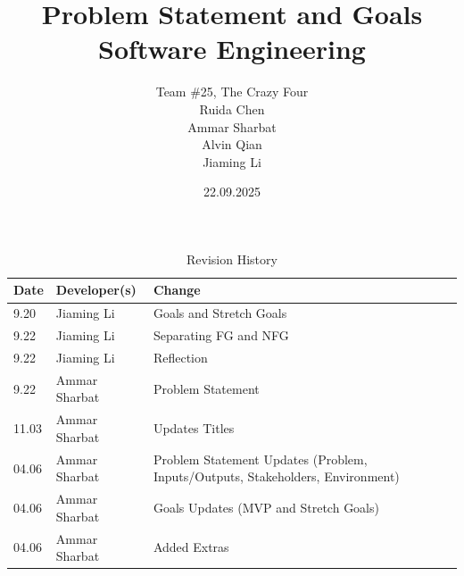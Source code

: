 \documentclass{article}
\title{Problem Statement and Goals\\\SE Software Engineering}
\author{
    Team \#25, The Crazy Four \\[1ex]
    Ruida Chen \\
    Ammar Sharbat \\
    Alvin Qian \\
    Jiaming Li \\
}
\date{22.09.2025}
\begin{document}
    \maketitle

    \begin{table}[hp]
        \caption{Revision History} \label{TblRevisionHistory}
        \begin{tabularx}{\textwidth}{llX}
            \toprule
            \textbf{Date} & \textbf{Developer(s)} & \textbf{Change}\\
            \midrule
            9.20 & Jiaming Li & Goals and Stretch Goals\\
            9.22 & Jiaming Li & Separating FG and NFG\\
            9.22 & Jiaming Li & Reflection\\
            9.22 & Ammar Sharbat & Problem Statement\\
            11.03 & Ammar Sharbat & Updates Titles\\
            04.06 & Ammar Sharbat & Problem Statement Updates (Problem, Inputs/Outputs, Stakeholders, Environment)\\
            04.06 & Ammar Sharbat & Goals Updates (MVP and Stretch Goals)\\
            04.06 & Ammar Sharbat & Added Extras\\
            \bottomrule
        \end{tabularx}
    \end{table}
\end{document}
